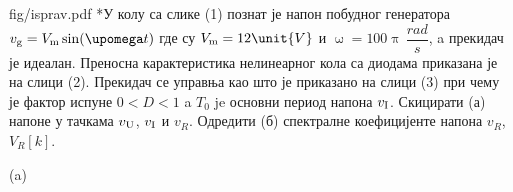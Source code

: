 \begin{slikaDesno}{fig/isprav.pdf}
{\color{red}*}\PID У колу са слике (1) познат је напон побудног 
генератора 
$v_{\rm g} = V_{\rm m} \sin(\upomega t)$ где су 
$V_{\rm m} = 12 \unit{V}$ и $\upomega = 
100\uppi \unit{\,\dfrac{rad}{s}}$, a 
прекидач је идеалан. Преносна карактеристика
нелинеарног кола са диодама приказана је на слици 
(2). Прекидач се управња као што је приказано на 
слици (3) при чему је 
фактор испуне $0 < D < 1$ a 
$T_0$ je основни период напона $v_{\rm I}$.
Скицирати (а) напоне у тачкама $v_{\rm U}$, 
$v_{\rm I}$ и $v_{R}$. Одредити 
(б) спектралне коефицијенте напона $v_{R}$, 
$V_{R}[k]$. 
\end{slikaDesno}
\vspace*{2mm}

\textsc{} (a) \\
